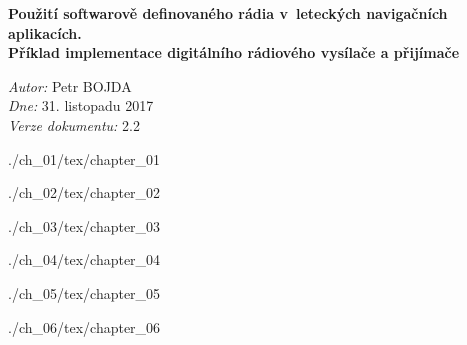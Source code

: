 \documentclass[twoside,11pt]{article}
\begin{document}
\begin{titlepage}
\center %
{ \huge \bfseries Použití softwarově definovaného rádia
			v~leteckých navigačních aplikacích.}\\[2in] %

\fontsize{17}{12}\textbf{\textcolor{bgr_DarkBlue}{Příklad implementace 
			digitálního rádiového vysílače a přijímače}}\\[3in] %
        
\begin{minipage}{0.9\textwidth}
\begin{flushleft} \large
\emph{Autor:} Petr \textsc{BOJDA}\\

\emph{Dne:} 31. listopadu 2017\\%
\emph{Verze dokumentu:} 2.2
\end{flushleft}
\end{minipage}
\end{titlepage}

 {./ch_01/tex/chapter_01}

 {./ch_02/tex/chapter_02}

 {./ch_03/tex/chapter_03}

 {./ch_04/tex/chapter_04}


 {./ch_05/tex/chapter_05}


 {./ch_06/tex/chapter_06}





\end{document}
